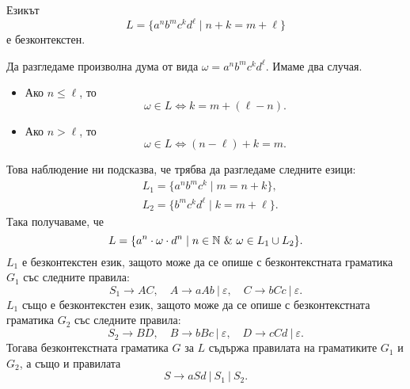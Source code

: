 \newpage
\begin{example}
  Езикът 
  \[L = \{a^nb^mc^kd^\ell \mid n+k = m + \ell\}\]
  е безконтекстен.
\end{example}
\begin{hint}
  Да разгледаме произволна дума от вида $\omega = a^n b^m c^k d^\ell$.
  Имаме два случая.
  \begin{itemize}
  \item
    Ако $n \leq \ell$, то
    \[\omega \in L \iff k = m + (\ell- n).\]
  \item
    Ако $n > \ell$, то 
    \[\omega \in L \iff (n-\ell) + k = m.\]
  \end{itemize}
  Това наблюдение ни подсказва, че трябва да разгледаме следните езици:
  \begin{align*}
    & L_1 = \{a^nb^mc^k \mid m = n+k\},\\
    & L_2 = \{b^mc^kd^\ell \mid k = m+\ell\}.
  \end{align*}
  Така получаваме, че
  \[L = \{a^n \cdot \omega \cdot d^n \mid n\in\Nat\ \&\ \omega \in L_1 \cup L_2\}.\]
  $L_1$ е безконтекстен език, защото може да се опише с безконтекстната граматика $G_1$ със следните правила:
  \[S_1 \to AC,\quad  A \to aAb\ |\ \varepsilon,\quad C \to bCc\ |\ \varepsilon.\]
  $L_1$ също е безконтекстен език, защото може да се опише с безконтекстната граматика $G_2$ със следните правила:
  \[S_2 \to BD,\quad B \to bBc\ |\ \varepsilon,\quad D \to cCd\ |\ \varepsilon.\]
  Тогава безконтекстната граматика $G$ за $L$ 
  съдържа правилата на граматиките $G_1$ и $G_2$, а също и правилата
  \[S \to aSd\ |\ S_1\ |\ S_2.\]
\end{hint}

